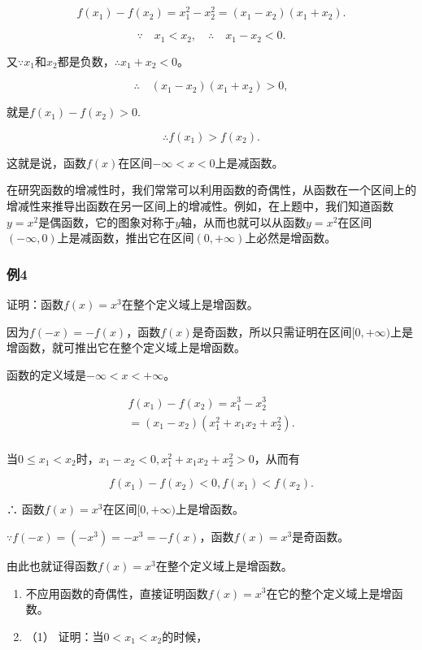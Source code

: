 \[
f (x_{1}) - f (x_{2}) = x_1^2 - x_{2}^{2} = (x_{1} - x_{2}) (x_{1} + x_{2}).
\]

\[
\because \quad x_{1} < x_{2}, \quad \therefore \quad x_{1} - x_{2} < 0.
\]

又\(\because x_{1}\)和\(x_{2}\)都是负数，\(\therefore x_{1} + x_{2} < 0\)。

\[
\therefore \quad (x_{1} - x_{2}) (x_{1} + x_{2}) > 0,
\]

就是\(f(x_{1}) - f(x_{2}) > 0.\)

\[
\therefore f (x_{1}) > f (x_{2}).
\]

这就是说，函数\(f(x)\)在区间\(-\infty < x < 0\)上是减函数。

在研究函数的增减性时，我们常常可以利用函数的奇偶性，从函数在一个区间上的增减性来推导出函数在另一区间上的增减性。例如，在上题中，我们知道函数\(y=x^2\)是偶函数，它的图象对称于\(y\)轴，从而也就可以从函数\(y = x^2\)在区间\((- \infty, 0)\)上是减函数，推出它在区间\((0, +\infty)\)上必然是增函数。

\subsubsection{例4}

证明：函数\(f(x) = x^3\)在整个定义域上是增函数。

因为\(f(-x) = -f(x)\)，函数\(f(x)\)是奇函数，所以只需证明在区间\([0, +\infty)\)上是增函数，就可推出它在整个定义域上是增函数。

 函数的定义域是\(-\infty < x < +\infty\)。

\[
\begin{array}{l} f (x_{1}) - f (x_{2}) = x_{1}^{3} - x_{2}^{3} \\ = (x_{1} - x_{2}) (x_{1}^{2} + x_{1} x_{2} + x_{2}^{2}). \\ \end{array}
\]

当\(0 \leqslant x_{1} < x_{2}\)时，\(x_{1} - x_{2} < 0, x_{1}^{2} + x_{1}x_{2} + x_{2}^{2} > 0\)，从而有

\[
f (x_{1}) - f (x_{2}) < 0, f (x_{1}) < f (x_{2}).
\]

∴ 函数\(f(x)=x^{3}\)在区间\([0,+\infty)\)上是增函数。

\(\because f(-x)=(-x^{3})=-x^{3}=-f(x)\)，函数\(f(x)=x^{3}\)是奇函数。

由此也就证得函数\(f(x) = x^3\)在整个定义域上是增函数。

\begin{enumerate}
\item
  不应用函数的奇偶性，直接证明函数\(f(x) = x^3\)在它的整个定义域上是增函数。
\item
  （1） 证明：当\(0 < x_{1} < x_{2}\)的时候，
\end{enumerate}

